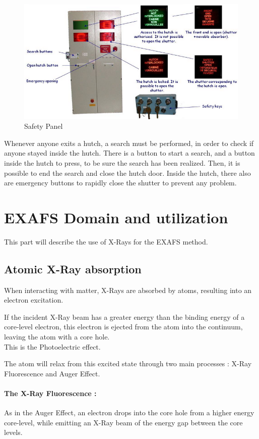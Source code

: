 \documentclass[11pt,a4paper,oneside]{report}
\begin{document}
\begin{figure}[H]
\centering
    \includegraphics[width=350pt]{Images/SafetyPanel.png}
    \caption{Safety Panel\cite{Safety}}
    \label{SafetyPanel}    
\end{figure}

Whenever anyone exits a hutch, a search must be performed, in order to check if anyone stayed inside the hutch. There is a button to start a search, and a button inside the hutch to press, to be sure the search has been realized. Then, it is possible to end the search and close the hutch door. Inside the hutch, there also are emergency buttons to rapidly close the shutter to prevent any problem.

\newpage
\section{EXAFS Domain and utilization}
This part will describe the use of X-Rays for the EXAFS method.

\subsection{Atomic X-Ray absorption}

When interacting with matter, X-Rays are absorbed by atoms, resulting into an electron excitation.

If the incident X-Ray beam has a greater energy than the binding energy of a core-level electron, this electron is ejected from the atom into the continuum, leaving the atom with a core hole\cite{Pres}.\\This is the Photoelectric effect.

The atom will relax from this excited state through two main processes : X-Ray Fluorescence and Auger Effect.

\paragraph{The X-Ray Fluorescence :} As in the Auger Effect, an electron drops into the core hole from a higher energy core-level, while emitting an X-Ray beam of the energy gap between the core levels.
\end{document}
